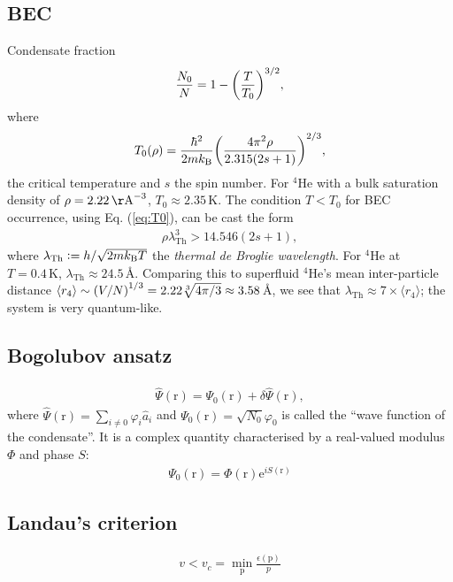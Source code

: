 \documentclass[11pt,a4paper,twoside]{article}
\renewcommand{\vec}[1]{\bm{\mathrm{#1}}}
\begin{document}
		\subsection{BEC}
			Condensate fraction
			\begin{align}
				\frac{N_0}{N} = 1-\qty(\frac{T}{T_0})^{3/2},
			\end{align}
			where
			\begin{align}
				T_0(\rho) = \frac{\hbar^2}{2mk_\mathrm{B}}\qty(\frac{4\pi^2\rho}{2.315(2s+1)})^{2/3},\label{eq:T0}
			\end{align}
			the critical temperature and $s$ the spin number. For $^4$He with a bulk saturation density of $\rho=2.22\,\mathrm\AA^{-3}$, $T_0\approx 2.35\,\mathrm{K}$. The condition $T<T_0$ for BEC occurrence, using Eq. (\ref{eq:T0}), can be cast the form
			\begin{align}
				\rho\lambda_{\mathrm{Th}}^3>14.546(2s+1),
			\end{align}
			where $\lambda_{\mathrm{Th}} \vcentcolon= h/\sqrt{2mk_\mathrm{B}T}$ the \emph{thermal de Broglie wavelength}. For $^4$He at $T=0.4\,\mathrm{K}$, $\lambda_{\mathrm{Th}}\approx 24.5$\,\AA. Comparing this to superfluid $^4$He's mean inter-particle distance $\langle r_4 \rangle \sim \qty(V/N)^{1/3}=2.22\sqrt[3]{4\pi/3}\approx 3.58$\,\AA, we see that $\lambda_{\mathrm{Th}}\approx 7\times\langle r_4 \rangle $; the system is very quantum-like.
		
		\subsection{Bogolubov ansatz}
			\begin{align}
				\hat{\Psi}(\vec{r})=\Psi_0(\vec{r})+\delta\hat{\Psi}(\vec{r}),
			\end{align}
			where $\hat{\Psi}(\vec{r})=\sum_{i\neq 0}\varphi_i\hat{a}_i$ and $\Psi_0(\vec{r})=\sqrt{N_0}\varphi_0$ is called the ``wave function of the condensate''. It is a complex quantity characterised by a real-valued modulus $\Phi$ and phase $S$:
			\begin{align}
				\Psi_0(\vec{r}) = \Phi(\vec{r})\mathrm{e}^{iS(\vec{r})}
			\end{align}
		
		\subsection{Landau's criterion}
			\begin{align}
				v<v_c = \min_{\vec{p}}\frac{\epsilon(\vec{p})}{p}
			\end{align}
			
\end{document}
